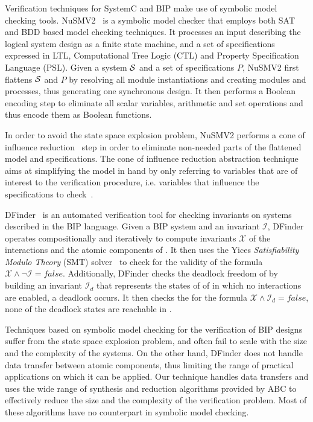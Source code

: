 Verification techniques for SystemC and BIP make use of symbolic model checking tools. 
NuSMV2~\cite{nusmv} is a symbolic model checker that employs both 
SAT and BDD based model checking techniques. It processes an input 
describing the logical system design as a finite state machine, and a set of specifications
expressed in LTL, Computational Tree Logic (CTL) and Property Specification Language (PSL).
Given a system $\mathcal{S}$ and a set of specifications $P$, NuSMV2 first flattens $\mathcal{S}$ and $P$ by 
resolving all module instantiations and creating modules and processes, thus generating one 
synchronous design. It then performs a Boolean encoding step to eliminate all scalar variables, 
arithmetic and set operations and thus encode them as Boolean functions.   

In order to avoid the state space explosion problem, NuSMV2 performs a cone of 
influence reduction~\cite{berezin1998compositional} step in order to eliminate
non-needed parts of the flattened model and specifications. The cone of influence
reduction abstraction technique aims at simplifying the model in hand by only 
referring to variables that are of interest to the verification procedure, i.e. variables
that influence the specifications to check~\cite{clarke1999model}.

DFinder~\cite{dfinder} is an automated verification tool for checking invariants
on systems described in the BIP language. Given a BIP system \Pm and 
an invariant $\mathcal{I}$, DFinder operates  compositionally and iteratively
to compute invariants $\mathcal{X}$ of the interactions and the atomic 
components of \Pm. It then uses the Yices {\em Satisfiability Modulo
Theory} (SMT) solver~\cite{dutertre2006fast} to check for the validity 
of the formula $\mathcal{X} \land \lnot \mathcal{I} = false$. 
Additionally, DFinder checks the deadlock freedom of  \Pm by building an invariant 
$\mathcal{I}_d$ that represents the states of of \Pm in which no interactions 
are enabled, \ie{} a deadlock occurs. It then checks the for the formula
$\mathcal{X} \land \mathcal{I}_d = false$, \ie{} none of the deadlock states
are reachable in \Pm.   

Techniques based on symbolic model checking for the verification of 
BIP designs suffer from the state space explosion problem, and often 
fail to scale with the size and the complexity of the systems. 
On the other hand, DFinder does not handle data transfer between 
atomic components, thus limiting the range of practical applications 
on which it can be applied. Our technique handles data transfers and uses the wide range of synthesis 
and reduction algorithms provided by ABC to effectively reduce the size and 
the complexity of the verification problem. Most of these algorithms have no counterpart
in symbolic model checking.  


